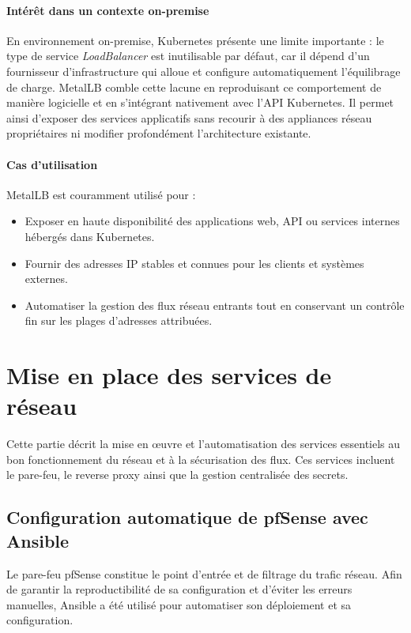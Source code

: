 \paragraph{Intérêt dans un contexte on-premise}

En environnement on-premise, Kubernetes présente une limite importante : le type de service \emph{LoadBalancer} est inutilisable par défaut, car il dépend d’un fournisseur d’infrastructure qui alloue et configure automatiquement l’équilibrage de charge. MetalLB comble cette lacune en reproduisant ce comportement de manière logicielle et en s’intégrant nativement avec l’API Kubernetes. Il permet ainsi d’exposer des services applicatifs sans recourir à des appliances réseau propriétaires ni modifier profondément l’architecture existante.

\paragraph{Cas d’utilisation}

MetalLB est couramment utilisé pour :
\begin{itemize}
	\item Exposer en haute disponibilité des applications web, API ou services internes hébergés dans Kubernetes.
	\item Fournir des adresses IP stables et connues pour les clients et systèmes externes.
	\item Automatiser la gestion des flux réseau entrants tout en conservant un contrôle fin sur les plages d’adresses attribuées.
\end{itemize}

\section{Mise en place des services de réseau}

Cette partie décrit la mise en œuvre et l’automatisation des services essentiels au bon fonctionnement du réseau et à la sécurisation des flux. Ces services incluent le pare-feu, le reverse proxy ainsi que la gestion centralisée des secrets.

\subsection{Configuration automatique de pfSense avec Ansible}

Le pare-feu pfSense constitue le point d’entrée et de filtrage du trafic réseau. Afin de garantir la reproductibilité de sa configuration et d’éviter les erreurs manuelles, Ansible a été utilisé pour automatiser son déploiement et sa configuration.

